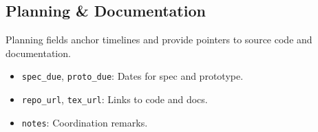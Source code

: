 \subsection{Planning \& Documentation}
Planning fields anchor timelines and provide pointers to source code and documentation.
\begin{itemize}
  \item \texttt{spec\_due}, \texttt{proto\_due}: Dates for spec and prototype.  
  \item \texttt{repo\_url}, \texttt{tex\_url}: Links to code and docs.  
  \item \texttt{notes}: Coordination remarks.
\end{itemize}
